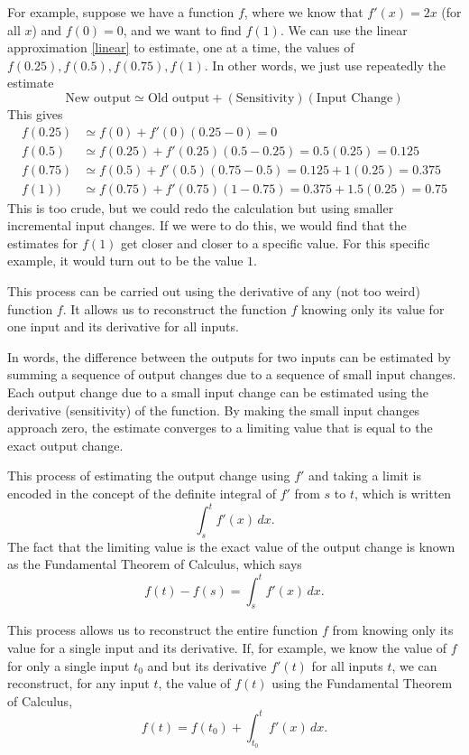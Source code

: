 \documentclass{math-deane}
\begin{document}
For example, suppose we have a function $f$, where we know that $f'(x) = 2x$ (for all $x$) and $f(0) = 0$, and we want to find $f(1)$. We can use the linear approximation \eqref{linear} to estimate, one at a time, the values of $f(0.25), f(0.5), f(0.75), f(1)$. In other words, we just use repeatedly the estimate
\[
\text{New output} \simeq \text{Old output} + (\text{Sensitivity})(\text{Input Change})
\]
This gives
\begin{align*}
f(0.25)	&\simeq f(0) + f'(0)(0.25-0) = 0\\
f(0.5) &\simeq f(0.25) + f'(0.25)(0.5-0.25) = 0.5(0.25) = 0.125\\
f(0.75) &\simeq f(0.5) + f'(0.5)(0.75-0.5) = 0.125 + 1(0.25) = 0.375\\
f(1)) &\simeq f(0.75) + f'(0.75)(1-0.75) = 0.375 + 1.5(0.25) = 0.75
\end{align*}
This is too crude, but we could redo the calculation but using smaller incremental input changes. If we were to do this, we would find that the estimates for $f(1)$ get closer and closer to a specific value. For this specific example, it would turn out to be the value $1$.

This process can be carried out using the derivative of any (not too weird) function $f$. It allows us to reconstruct the function $f$ knowing only its value for one input and its derivative for all inputs.

In words, the difference between the outputs for two inputs can be estimated by summing a sequence of output changes due to a sequence of small input changes. Each output change due to a small input change can be estimated using the derivative (sensitivity) of the function. By making the small input changes approach zero, the estimate converges to a limiting value that is equal to the exact output change.

This process of estimating the output change using $f'$ and taking a limit is encoded in the concept of the definite integral of $f'$ from $s$ to $t$, which is written
\[ \int_s^t f'(x)\,dx. \]
The fact that the limiting value is the exact value of the output change is known as the Fundamental Theorem of Calculus, which says
\[ f(t) - f(s) = \int_s^t f'(x)\,dx. \]

This process allows us to reconstruct the entire function $f$ from knowing only its value for a single input and its derivative. If, for example, we know the value of $f$ for only a single input $t_0$ and but its derivative $f'(t)$ for all inputs $t$, we can reconstruct, for any input $t$, the value of $f(t)$ using the Fundamental Theorem of Calculus,
\[
f(t) = f(t_0) + \int_{t_0}^t f'(x)\,dx.
\]
\end{document}
